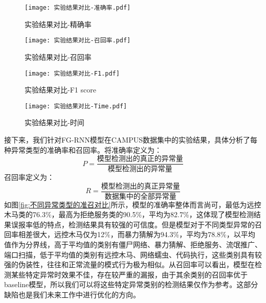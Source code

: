   \begin{figure}[htbp]
    \centering
    \begin{minipage}[t]{0.48\textwidth}
    \centering
    \texttt{[image: 实验结果对比-准确率.pdf]}
    \caption{实验结果对比-精确率}
    \end{minipage}
    \begin{minipage}[t]{0.48\textwidth}
    \centering
    \texttt{[image: 实验结果对比-召回率.pdf]}
    \caption{实验结果对比-召回率}
    \end{minipage}
    \end{figure}

    \begin{figure}[htbp]
      \centering
      \begin{minipage}[t]{0.48\textwidth}
      \centering
      \texttt{[image: 实验结果对比-F1.pdf]}
      \caption{实验结果对比-F1 score}
      \end{minipage}
      \begin{minipage}[t]{0.48\textwidth}
      \centering
      \texttt{[image: 实验结果对比-Time.pdf]}
      \caption{实验结果对比-时间}
      \end{minipage}
      \end{figure}

接下来，我们针对FG-RNN模型在CAMPUS数据集中的实验结果，具体分析了每种异常类型的准确率和召回率。将准确率定义为：
\begin{equation}
  P = \frac{\mbox{模型检测出的真正的异常量}}{\mbox{模型检测出的异常量}}
\end{equation}
召回率定义为：
\begin{equation}
  R = \frac{\mbox{模型检测出的真正异常量}}{\mbox{数据集中的全部异常量}}
\end{equation}
如图\ref{fig:不同异常类型的准召对比}所示，模型的准确率整体而言尚可，最低为远控木马类的76.3\%，最高为拒绝服务类的90.5\%，平均为82.7\%，这体现了模型检测结果误报率低的特点，检测结果具有较强的可信度。但是模型对于不同类型异常的召回率相差很大，远控木马仅为12\%，而暴力猜解为94.3\%，平均为78.8\%，以平均值作为分界线，高于平均值的类别有僵尸网络、暴力猜解、拒绝服务、流氓推广、端口扫描，低于平均值的类别有远控木马、网络蠕虫、代码执行，这些类别具有较强的伪装性，往往和正常流量的模式行为极为相似。从召回率可以看出，模型在检测某些特定异常时效果不佳，存在较严重的漏报，由于其余类别的召回率优于baseline模型，所以我们可以将这些特定异常类别的检测结果仅作为参考。这部分缺陷也是我们未来工作中进行优化的方向。


